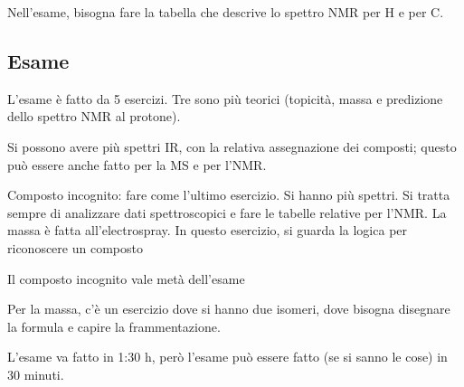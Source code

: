 Nell'esame, bisogna fare la tabella che descrive lo spettro NMR per H e per C.

\subsection{Esame}

L'esame è fatto da 5 esercizi. Tre sono più teorici (topicità, massa e
predizione dello spettro NMR al protone).

Si possono avere più spettri IR, con la relativa assegnazione dei
composti; questo può essere anche fatto per la MS e per l'NMR.

Composto incognito: fare come l'ultimo esercizio. Si hanno più spettri.
Si tratta sempre di analizzare dati spettroscopici e fare le tabelle
relative per l'NMR. La massa è fatta all'electrospray. In questo
esercizio, si guarda la logica per riconoscere un composto

Il composto incognito vale metà dell'esame

Per la massa, c'è un esercizio dove si hanno due isomeri, dove bisogna
disegnare la formula e capire la frammentazione.

L'esame va fatto in 1:30 h, però l'esame può essere fatto (se si sanno
le cose) in 30 minuti.